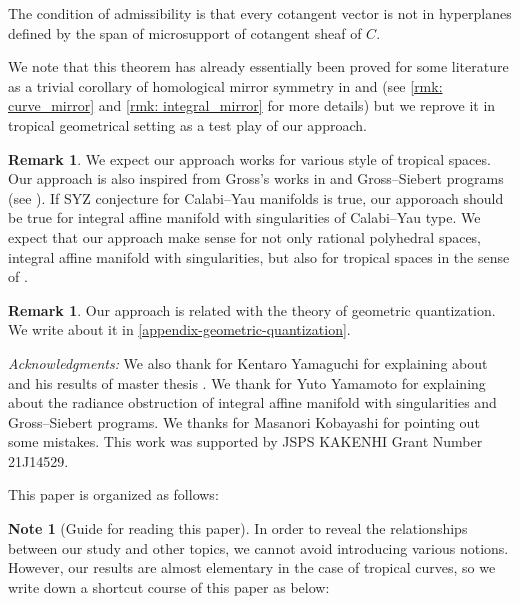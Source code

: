 \documentclass[a4paper,dvipdfmx,reqno,12pt]{amsart}
\theoremstyle{definition}
\newtheorem{Note}[theorem]{Note}
\newtheorem{remark}[theorem]{Remark}
\numberwithin{equation}{section}
\begin{document}
The condition of admissibility is that every cotangent vector 
is not in hyperplanes defined by the span of microsupport of
cotangent sheaf of $C$. 


We note that this theorem has already essentially been proved for some
literature as a trivial corollary of homological mirror symmetry 
in \cite{MR4301560} and \cite{auroux2022lagrangian} (see \cref{rmk: curve_mirror} and \cref{rmk: integral_mirror} 
for more details) but we reprove it in tropical  
geometrical setting as a test play of our approach.

\begin{remark}
We expect our approach works for various style 
of tropical spaces. 
Our approach is 
also inspired from Gross's 
works in 
\cite{grossSpecialLagrangianFibrations1998a} 
and Gross--Siebert programs
(see \cite[Conjecture 1.6]{MR3525095}).
If SYZ conjecture for Calabi--Yau manifolds
is true, our apporoach should
be true for integral affine manifold 
with singularities of Calabi--Yau type.
We expect that 
our approach make sense for not only rational polyhedral
spaces, integral affine manifold with singularities,
but also for tropical spaces 
in the sense of \cite[Definition 2.8]{cavalieri2020tropical}.

\end{remark}

\begin{remark}
Our approach is related with the theory of
geometric quantization. We write about it in 
\cref{appendix-geometric-quantization}.
\end{remark}

\textit{Acknowledgments:}
We also thank for Kentaro Yamaguchi for explaining about
\cite{MR4234675} and his results of master thesis 
\cite{yamaguchimaster}. We thank for Yuto Yamamoto for
explaining about the radiance obstruction of integral 
affine manifold with singularities and Gross--Siebert
programs. We thanks for Masanori Kobayashi for 
pointing out some mistakes. 
This work was supported by JSPS KAKENHI 
Grant Number 21J14529.

This paper is organized as follows:

\begin{Note}[Guide for reading this paper]
  In order to reveal the relationships between our study
  and other topics, we cannot avoid introducing various
  notions. However, our results are almost elementary
in the case of tropical curves,
  so we write down a shortcut course of this paper as below:
\end{Note}
\end{document}
